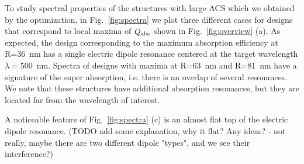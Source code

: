 \documentclass[aps,prl,twocolumn,showpacs,superscriptaddress,groupedaddress]{revtex4-1}
\begin{document}
\begin{figure}
\end{figure}
%
To study spectral properties of the structures with large ACS which we
obtained by the optimization, in Fig.~\ref{fig:spectra} we plot three
different cases for designs that correspond to local maxima of $Q_{\rm
  abs}$ shown in Fig.~\ref{fig:overview} (a).  As expected, the design
corresponding to the maximum absorption efficiency at R=36~nm has a
single electric dipole resonance centered at the target wavelength
$\lambda=500$~nm. Spectra of designs with maxima at R=63~nm and
R=81~nm have a signature of the super absorption, i.e. there is an
overlap of several resonances.  We note that these structures have
additional absorption resonances, but they are located far from the
wavelength of interest.

A noticeable feature of Fig.~\ref{fig:spectra} (c) is an almost flat
top of the electric dipole resonance. (TODO add some explanation, why
it flat? Any ideas?  - not really, maybe there are two different
dipole "types", and we see their interference?)
\end{document}
